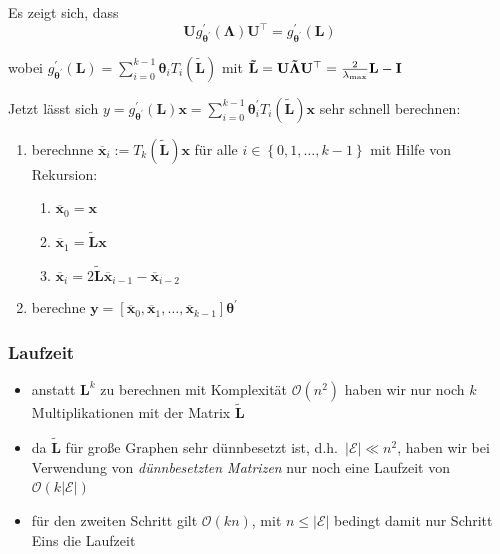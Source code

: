 
Es zeigt sich, dass
\begin{equation}
  \mathbf{U} g^{\prime}_{\mathbf{\theta}^{\prime}}\left(\mathbf{\Lambda}\right) \mathbf{U}^{\top} = g^{\prime}_{\mathbf{\theta}^{\prime}}\left(\mathbf{L}\right)
\end{equation}

wobei $g^{\prime}_{\mathbf{\theta}^{\prime}}\left(\mathbf{L}\right) = \sum_{i=0}^{k-1} \mathbf{\theta}_i T_i\left(\mathbf{\tilde L}\right)$ mit $\mathbf{\tilde L} = \mathbf{U}\mathbf{\tilde \Lambda}\mathbf{U}^{\top} = \frac{2}{\lambda_{\max}}\mathbf{L} - \mathbf{I}$

Jetzt lässt sich $y = g^{\prime}_{\mathbf{\theta^{\prime}}}\left(\mathbf{L}\right) \mathbf{x} = \sum_{i=0}^{k-1} \mathbf{\theta}^{\prime}_i T_i \left(\mathbf{\tilde L}\right) \mathbf{x}$ sehr schnell berechnen:

\begin{enumerate}
  \item berechnne $\mathbf{\overline{x}}_i := T_k \left(\mathbf{\tilde L}\right) \mathbf{x}$ für alle $i \in \left\{ 0, 1, \ldots, k-1 \right\}$ mit Hilfe von Rekursion:
  \begin{enumerate}
    \item $\mathbf{\overline{x}}_0 = \mathbf{x}$
    \item $\mathbf{\overline{x}}_1 = \mathbf{\tilde L} \mathbf{x}$
    \item $\mathbf{\overline{x}}_i = 2\mathbf{\tilde L} \mathbf{\overline{x}}_{i-1} - \mathbf{\overline{x}}_{i-2}$
  \end{enumerate}
\item berechne $\mathbf{y} = \left[\mathbf{\overline{x}}_0, \mathbf{\overline{x}}_1, \ldots, \mathbf{\overline{x}}_{k-1} \right] \mathbf{\theta}^{\prime}$
\end{enumerate}

\subsubsection{Laufzeit}

 \begin{itemize}
   \item anstatt $\mathbf{L}^k$ zu berechnen mit Komplexität $\mathcal{O}\left(n^2\right)$ haben wir nur noch $k$ Multiplikationen mit der Matrix $\mathbf{\tilde L}$
   \item da $\mathbf{\tilde L}$ für große Graphen sehr dünnbesetzt ist, d.h.\ $\left|\mathcal{E}\right| \ll n^2$, haben wir bei Verwendung von \emph{dünnbesetzten Matrizen} nur noch eine Laufzeit von $\mathcal{O}\left(k\left|\mathcal{E}\right|\right)$~\cite{Hammond, Defferrard}
   \item für den zweiten Schritt gilt $\mathcal{O}\left(kn\right)$, mit $n \leq \left|\mathcal{E}\right|$ bedingt damit nur Schritt Eins die Laufzeit
 \end{itemize}
